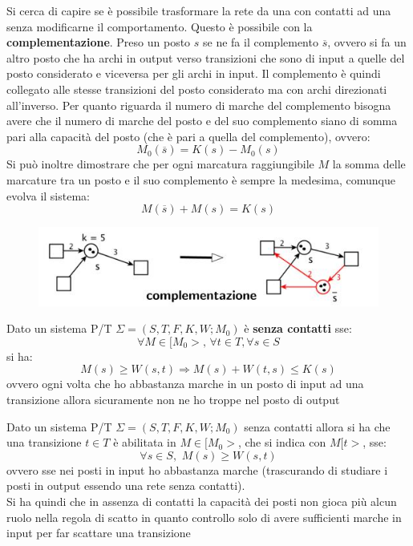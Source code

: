 \documentclass[a4paper,12pt, oneside]{book}
\begin{document}
\newpage
Si cerca di capire se è possibile trasformare la rete da una con contatti ad una
senza modificarne il comportamento. Questo è possibile con la
\textbf{complementazione}. Preso un posto $s$ se ne fa il complemento
$\overline{s}$, ovvero si fa un altro posto che ha archi in output verso
transizioni che sono di input a quelle del posto considerato e viceversa per gli
archi in input. Il complemento è quindi collegato alle stesse transizioni del
posto considerato ma con archi direzionati all'inverso. Per quanto riguarda il
numero di marche del complemento bisogna avere che il numero di marche del posto
e del suo complemento siano di somma pari alla capacità del posto (che è pari a
quella del complemento), ovvero:
\[M_0(\overline{s})=K(s)-M_0(s)\]
Si può inoltre dimostrare che per ogni marcatura raggiungibile $M$ la somma
delle marcature tra un posto e il suo complemento è sempre la medesima, comunque
evolva il sistema:
\[M(\overline{s})+M(s)=K(s)\]
\begin{figure}[H]
  \centering
  \includegraphics[scale = 0.65]{img/pt35.jpg}
\end{figure}
\begin{definizione}
  Dato un sistema P/T $\Sigma=(S, T , F , K , W;M_0)$ è \textbf{senza contatti}
  sse:
  \[\forall M\in[M_0>,\,\forall t\in T,\forall s\in S\]
  si ha:
  \[M(s)\geq W(s,t)\Rightarrow M(s)+W(t,s)\leq K(s)\]
  ovvero ogni volta che ho abbastanza marche in un posto di input ad una
  transizione allora sicuramente non ne ho troppe nel posto di output
\end{definizione}
\begin{definizione}
  Dato un sistema P/T $\Sigma=(S, T , F , K , W;M_0)$ senza contatti allora si
  ha che una transizione $t\in T$ è abilitata in $M\in[M_0>$, che si indica
  con $M[t>$, sse: 
  \[\forall s\in S,\,\,M(s)\geq W(s,t)\]
  ovvero sse nei posti in input ho abbastanza marche (trascurando di studiare
  i posti in output essendo una rete senza contatti).\\
  Si ha quindi che in assenza di contatti la capacità dei posti non gioca più
  alcun ruolo nella regola di scatto in quanto controllo solo di avere
  sufficienti marche in input per far scattare una transizione
\end{definizione}
\end{document}
